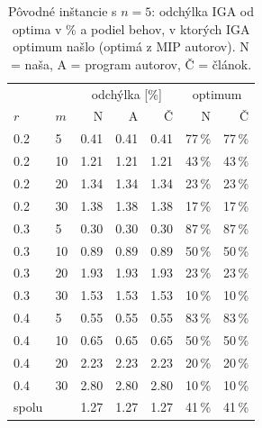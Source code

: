 \begin{table}[ht]
\centering
\small
\caption{Pôvodné inštancie s $n=5$: odchýlka IGA od optima v \% a podiel behov, v ktorých IGA optimum našlo (optimá z MIP autorov). N = naša, A = program autorov, Č = článok.}
\label{tab:orig_opt_n5}
\begin{tabular}{ll|rrr|rr}
\toprule
 & & \multicolumn{3}{c|}{odchýlka [\%]} & \multicolumn{2}{c}{optimum} \\
$r$ & $m$ & N & A & Č & N & Č \\
\midrule
0.2 & 5 & 0.41 & 0.41 & 0.41 & 77\,\% & 77\,\% \\
0.2 & 10 & 1.21 & 1.21 & 1.21 & 43\,\% & 43\,\% \\
0.2 & 20 & 1.34 & 1.34 & 1.34 & 23\,\% & 23\,\% \\
0.2 & 30 & 1.38 & 1.38 & 1.38 & 17\,\% & 17\,\% \\
0.3 & 5 & 0.30 & 0.30 & 0.30 & 87\,\% & 87\,\% \\
0.3 & 10 & 0.89 & 0.89 & 0.89 & 50\,\% & 50\,\% \\
0.3 & 20 & 1.93 & 1.93 & 1.93 & 23\,\% & 23\,\% \\
0.3 & 30 & 1.53 & 1.53 & 1.53 & 10\,\% & 10\,\% \\
0.4 & 5 & 0.55 & 0.55 & 0.55 & 83\,\% & 83\,\% \\
0.4 & 10 & 0.65 & 0.65 & 0.65 & 50\,\% & 50\,\% \\
0.4 & 20 & 2.23 & 2.23 & 2.23 & 20\,\% & 20\,\% \\
0.4 & 30 & 2.80 & 2.80 & 2.80 & 10\,\% & 10\,\% \\
\midrule
spolu &  & 1.27 & 1.27 & 1.27 & 41\,\% & 41\,\% \\
\bottomrule
\end{tabular}
\end{table}
